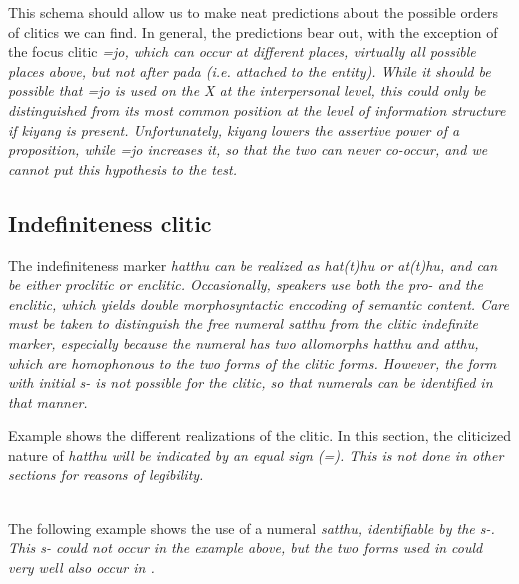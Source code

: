 This schema should allow us to make neat predictions about the possible orders of clitics we can find. In general, the predictions bear out, with the exception of the focus clitic \em =jo\em, which can occur at different places, virtually all possible places above, but not after \em pada \em (i.e. attached to the entity). While it should be possible that \em =jo \em is used on the X at the interpersonal level, this could only be distinguished from its most common position at the level of information structure if \em kiyang \em is present. Unfortunately, \em kiyang \em lowers the assertive power of a proposition, while \em =jo \em increases it, so that the two can never co-occur, and we cannot put this hypothesis to the test.

 
\subsection{Indefiniteness clitic}\label{sec:morph:Indefinitenessclitic}
The  indefiniteness marker \em hatthu \em can be realized as \em hat(t)hu \em or \em at(t)hu, \em and can be either proclitic or enclitic. Occasionally, speakers use both the pro- and the enclitic, which yields double morphosyntactic enccoding of semantic content. Care must be taken to distinguish the free numeral \em satthu \em from the clitic indefinite marker, especially because the numeral has two allomorphs  \em hatthu \em and \em atthu\em, which are homophonous to the two forms of the clitic forms. However, the form with initial \em s- \em is not possible for the clitic, so that numerals can be identified in that manner.

Example   shows the different realizations of the clitic. In this section, the cliticized nature of \em hatthu \em will be indicated by an equal sign (=). This is not done in other sections for reasons of legibility.

\\ 

The following example shows the use of a numeral \em satthu, \em identifiable by the \em s-\em. This \em s- \em could not occur in the example above, but the two forms used in  could very well also occur in .

